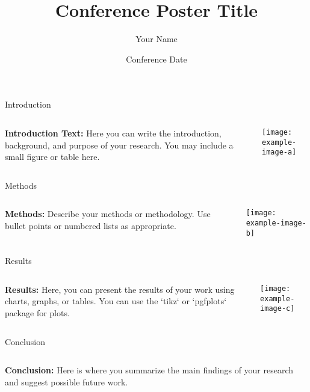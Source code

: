 \documentclass[final]{beamer}
\title{Conference Poster Title}
\author{Your Name}
\institute{Your Institution}
\date{Conference Date}
\begin{document}
\begin{frame}[t]
    \maketitle
\end{frame}

\begin{frame}{Introduction}
    \begin{columns}
        \begin{column}{0.5\textwidth}
            \textbf{Introduction Text:} Here you can write the introduction, background, and purpose of your research. You may include a small figure or table here.
        \end{column}
        \begin{column}{0.5\textwidth}
            \texttt{[image: example-image-a]} %
        \end{column}
    \end{columns}
\end{frame}

\begin{frame}{Methods}
    \begin{columns}
        \begin{column}{0.5\textwidth}
            \textbf{Methods:} Describe your methods or methodology. Use bullet points or numbered lists as appropriate.
        \end{column}
        \begin{column}{0.5\textwidth}
            \texttt{[image: example-image-b]} %
        \end{column}
    \end{columns}
\end{frame}

\begin{frame}{Results}
    \begin{columns}
        \begin{column}{0.5\textwidth}
            \textbf{Results:} Here, you can present the results of your work using charts, graphs, or tables. You can use the `tikz` or `pgfplots` package for plots.
        \end{column}
        \begin{column}{0.5\textwidth}
            \texttt{[image: example-image-c]} %
        \end{column}
    \end{columns}
\end{frame}

\begin{frame}{Conclusion}
    \begin{columns}
        \begin{column}{0.5\textwidth}
            \textbf{Conclusion:} Here is where you summarize the main findings of your research and suggest possible future work.
        \end{column}
    \end{columns}
\end{frame}
\end{document}
